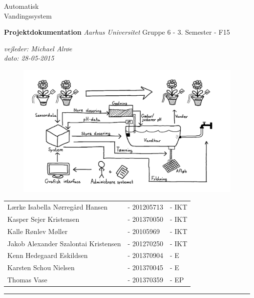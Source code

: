 
\begin{titlingpage}

\noindent
\titlefont Automatisk \\[0.7\baselineskip] Vandingssystem\par
\epigraph{
\textbf{Projektdokumentation}\newline
\textit{Aarhus Universitet}\newline
Gruppe 6 - 3. Semester - F15\newline
}%
{\textit{vejleder: Michael Alrøe}\\
\textit{dato: 28-05-2015}}
\vspace*{2cm}
\begin{minipage}{0.64\linewidth}
    \begin{flushleft}
		\normalsize
		\begin{figure}[H]
			\centering
			\includegraphics[scale=0.55]{Forside/rigebillede}
			\label{photo:RigeBillede}
		\end{figure}
    \end{flushleft}
\end{minipage}
\null\vfill
\vspace*{1cm}
\noindent

\begin{minipage}{0.64\linewidth}
    \begin{flushleft}
		\normalsize
		\begin{tabular}{l l l}
 			  Lærke Isabella Nørregård Hansen 		&- 201205713 	&- IKT \\
			  Kasper Sejer Kristensen				&- 201370050	&- IKT \\
			  Kalle Rønlev Møller					&- 20105969		&- IKT \\
			  Jakob Alexander Szalontai Kristensen	&- 201270250	&- IKT \\
			  Kenn Hedegaard Eskildsen				&- 201370904	&- E   \\
			  Karsten Schou Nielsen					&- 201370045	&- E   \\
			  Thomas Vase							&- 201370359	&- EP
		\end{tabular}
    \end{flushleft}
\end{minipage}
%
\begin{minipage}{0.02\linewidth}
    \rule{1pt}{90pt}
\end{minipage}
\titlepagedecoration
\end{titlingpage}
